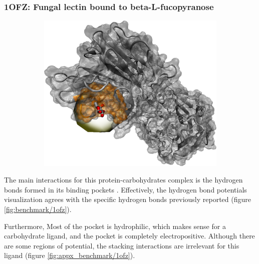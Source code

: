    \subsubsection{1OFZ: Fungal lectin bound to beta-L-fucopyranose}
      \begin{figure}[H] \centering
        \begin{subfigure}[c]{0.3\textwidth} \centering
          \includegraphics[width=1\textwidth]{figures/results/ps_prot/1ofz.png}
        \end{subfigure}
        \begin{subfigure}[c]{0.3\textwidth} \centering
        \end{subfigure}
      \end{figure}

      The main interactions for this protein-carbohydrates complex is the hydrogen bonds formed in its binding pockets \cite{hbonds_2023}. Effectively, the hydrogen bond potentials visualization agrees with the specific hydrogen bonds previously reported (figure \ref{fig:benchmark/1ofz}).

      Furthermore, Most of the pocket is hydrophilic, which makes sense for a carbohydrate ligand, and the pocket is completely electropositive. Although there are some regions of potential, the stacking interactions are irrelevant for this ligand (figure \ref{fig:appx_benchmark/1ofz}).


